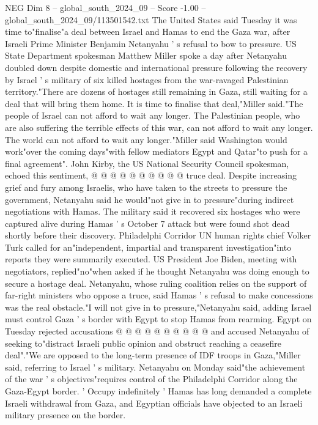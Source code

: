 \begin{textsample}{NEG Dim 8 – global\_south\_2024\_09 – Score -1.00 – global\_south\_2024\_09/113501542.txt}  \label{ex:f8_neg_167}
The United States said Tuesday it was time to"finalise"a deal between Israel and Hamas to end the Gaza war, after Israeli Prime Minister Benjamin Netanyahu ' s refusal to bow to pressure.
US State Department spokesman Matthew Miller spoke a day after Netanyahu doubled down despite domestic and international pressure following the recovery by Israel ' s military of six killed hostages from the war-ravaged Palestinian territory."There are dozens of hostages still remaining in Gaza, still waiting for a deal that will bring them home.
It is time to finalise that deal,"Miller said."The people of Israel can not afford to wait any longer.
The Palestinian people, who are also suffering the terrible effects of this war, can not afford to wait any longer.
The world can not afford to wait any longer."Miller said Washington would work"over the coming days"with fellow mediators Egypt and Qatar"to push for a final agreement".
John Kirby, the US National Security Council spokesman, echoed this sentiment, @ @ @ @ @ @ @ @ @ @ truce deal.
Despite increasing grief and fury among Israelis, who have taken to the streets to pressure the government, Netanyahu said he would"not give in to pressure"during indirect negotiations with Hamas.
The military said it recovered six hostages who were captured alive during Hamas ' s October 7 attack but were found shot dead shortly before their discovery.
Philadelphi Corridor UN human rights chief Volker Turk called for an"independent, impartial and transparent investigation"into reports they were summarily executed.
US President Joe Biden, meeting with negotiators, replied"no"when asked if he thought Netanyahu was doing enough to secure a hostage deal.
Netanyahu, whose ruling coalition relies on the support of far-right ministers who oppose a truce, said Hamas ' s refusal to make concessions was the real obstacle."I will not give in to pressure,"Netanyahu said, adding Israel must control Gaza ' s border with Egypt to stop Hamas from rearming.
Egypt on Tuesday rejected accusations @ @ @ @ @ @ @ @ @ @ and accused Netanyahu of seeking to"distract Israeli public opinion and obstruct reaching a ceasefire deal"."We are opposed to the long-term presence of IDF troops in Gaza,"Miller said, referring to Israel ' s military.
Netanyahu on Monday said"the achievement of the war ' s objectives"requires control of the Philadelphi Corridor along the Gaza-Egypt border. ' Occupy indefinitely ' Hamas has long demanded a complete Israeli withdrawal from Gaza, and Egyptian officials have objected to an Israeli military presence on the border.

\end{textsample}
